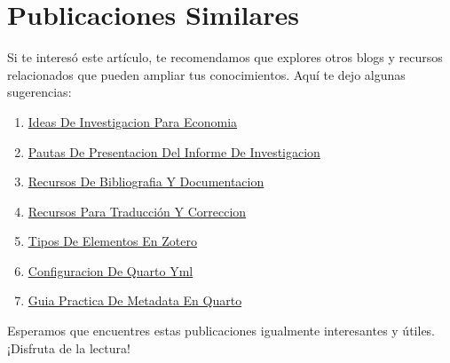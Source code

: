 \documentclass[
  man,
  floatsintext,
  longtable,
  a4paper,
  nolmodern,
  notxfonts,
  notimes,
  12pt,
  colorlinks=true,linkcolor=blue,citecolor=blue,urlcolor=blue]{apa7}
\providecommand{\tightlist}{%
  \setlength{\itemsep}{0pt}\setlength{\parskip}{0pt}}
\begin{document}
\appendix

\section{Publicaciones Similares}\label{apx-publicaciones-similares}

Si te interesó este artículo, te recomendamos que explores otros blogs y
recursos relacionados que pueden ampliar tus conocimientos. Aquí te dejo
algunas sugerencias:

\begin{enumerate}
\def\labelenumi{\arabic{enumi}.}
\tightlist
\item
  \href{https://methodica.netlify.app/posts/2023-06-03-ideas-de-investigacion-para-economia/index.pdf}{}
  \href{https://methodica.netlify.app/posts/2023-06-03-ideas-de-investigacion-para-economia}{Ideas
  De Investigacion Para Economia}
\item
  \href{https://methodica.netlify.app/posts/2023-06-03-pautas-de-presentacion-del-informe-de-investigacion/index.pdf}{}
  \href{https://methodica.netlify.app/posts/2023-06-03-pautas-de-presentacion-del-informe-de-investigacion}{Pautas
  De Presentacion Del Informe De Investigacion}
\item
  \href{https://methodica.netlify.app/posts/2025-01-12-recursos-de-bibliografia-y-documentacion/index.pdf}{}
  \href{https://methodica.netlify.app/posts/2025-01-12-recursos-de-bibliografia-y-documentacion}{Recursos
  De Bibliografia Y Documentacion}
\item
  \href{https://methodica.netlify.app/posts/2025-02-09-recursos-para-traducción-y-correccion/index.pdf}{}
  \href{https://methodica.netlify.app/posts/2025-02-09-recursos-para-traducción-y-correccion}{Recursos
  Para Traducción Y Correccion}
\item
  \href{https://methodica.netlify.app/posts/2025-04-23-tipos-de-elementos-en-zotero/index.pdf}{}
  \href{https://methodica.netlify.app/posts/2025-04-23-tipos-de-elementos-en-zotero}{Tipos
  De Elementos En Zotero}
\item
  \href{https://methodica.netlify.app/posts/2026-01-02-configuracion-de-quarto-yml/index.pdf}{}
  \href{https://methodica.netlify.app/posts/2026-01-02-configuracion-de-quarto-yml}{Configuracion
  De Quarto Yml}
\item
  \href{https://methodica.netlify.app/posts/2026-01-02-guia-practica-de-metadata-en-quarto/index.pdf}{}
  \href{https://methodica.netlify.app/posts/2026-01-02-guia-practica-de-metadata-en-quarto}{Guia
  Practica De Metadata En Quarto}
\end{enumerate}

Esperamos que encuentres estas publicaciones igualmente interesantes y
útiles. ¡Disfruta de la lectura!
\end{document}
